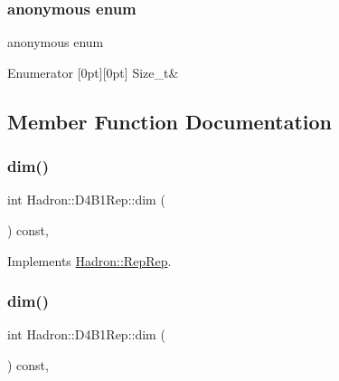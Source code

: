 \subsubsection{\texorpdfstring{anonymous enum}{anonymous enum}}
{\footnotesize\ttfamily anonymous enum}

\begin{DoxyEnumFields}{Enumerator}
[0pt][0pt]{}\mbox{\label{structHadron_1_1D4B1Rep_adb4b761ea2560f506e60ee1a879d62c0a8bd8705c9eae0e6d8f1c1909363ca41b}} 
Size\+\_\+t&\\
\hline

\end{DoxyEnumFields}


\subsection{Member Function Documentation}
\mbox{\label{structHadron_1_1D4B1Rep_adac801c8769811e585d8c984477629ae}} 
\subsubsection{\texorpdfstring{dim()}{dim()}\hspace{0.1cm}{\footnotesize\ttfamily [1/5]}}
{\footnotesize\ttfamily int Hadron\+::\+D4\+B1\+Rep\+::dim (\begin{DoxyParamCaption}{ }\end{DoxyParamCaption}) const\hspace{0.3cm}{\ttfamily [inline]}, {\ttfamily [virtual]}}



Implements \mbox{\hyperlink{structHadron_1_1RepRep_a92c8802e5ed7afd7da43ccfd5b7cd92b}{Hadron\+::\+Rep\+Rep}}.

\mbox{\label{structHadron_1_1D4B1Rep_adac801c8769811e585d8c984477629ae}} 
\subsubsection{\texorpdfstring{dim()}{dim()}\hspace{0.1cm}{\footnotesize\ttfamily [2/5]}}
{\footnotesize\ttfamily int Hadron\+::\+D4\+B1\+Rep\+::dim (\begin{DoxyParamCaption}{ }\end{DoxyParamCaption}) const\hspace{0.3cm}{\ttfamily [inline]}, {\ttfamily [virtual]}}



